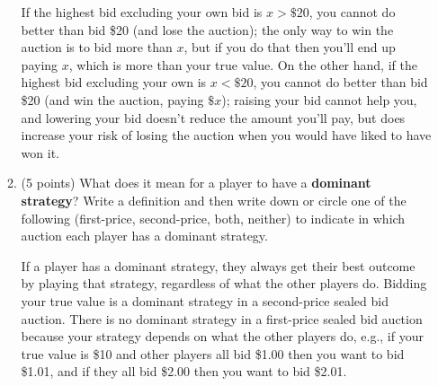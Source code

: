 \documentclass[twoside]{article}
\newcommand{\mybigskip}{\vspace{1in}}
\newcommand{\mybiggerskip}{\vspace{1.5in}}
\begin{document}
\begin{enumerate}
\begin{enumerate}
\begin{KEY}
If the highest bid excluding your own bid is $x>\$20$, you cannot do better than bid \$20 (and lose the auction); the only way to win the auction is to bid more than $x$, but if you do that then you'll end up paying $x$, which is more than your true value. On the other hand, if the highest bid excluding your own is $x<\$20$, you cannot do better than bid \$20 (and win the auction, paying $\$x$); raising your bid cannot help you, and lowering your bid doesn't reduce the amount you'll pay, but does increase your risk of losing the auction when you would have liked to have won it.
\end{KEY}








    \item \begin{EXAM} (5 points) \enlargethispage{1\baselineskip} What does it mean for a player to have a \textbf{dominant strategy}? Write a definition and then write down or circle one of the following (first-price, second-price, both, neither) to indicate in which auction each player has a dominant strategy.  \mybiggerskip\end{EXAM}

\begin{KEY}
If a player has a dominant strategy, they always get their best outcome by playing that strategy, regardless of what the other players do. Bidding your true value is a dominant strategy in a second-price sealed bid auction. There is no dominant strategy in a first-price sealed bid auction because your strategy depends on what the other players do, e.g., if your true value is \$10 and other players all bid \$1.00 then you want to bid \$1.01, and if they all bid \$2.00 then you want to bid \$2.01.
\end{KEY}


\end{enumerate}
\end{enumerate}
\end{document}
